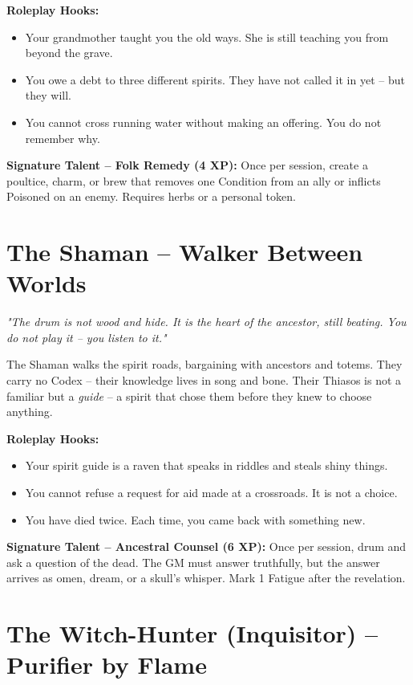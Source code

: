 \documentclass[10pt,a5paper]{book}
\begin{document}
\textbf{Roleplay Hooks:}
\begin{itemize}
    \item Your grandmother taught you the old ways. She is still teaching you from beyond the grave.
    \item You owe a debt to three different spirits. They have not called it in yet -- but they will.
    \item You cannot cross running water without making an offering. You do not remember why.
\end{itemize}

\textbf{Signature Talent -- Folk Remedy (4 XP):} Once per session, create a poultice, charm, or brew that removes one Condition from an ally or inflicts Poisoned on an enemy. Requires herbs or a personal token.

\section{The Shaman -- Walker Between Worlds}

\textit{"The drum is not wood and hide. It is the heart of the ancestor, still beating. You do not play it -- you listen to it."}

The Shaman walks the spirit roads, bargaining with ancestors and totems. They carry no Codex -- their knowledge lives in song and bone. Their Thiasos is not a familiar but a \textit{guide} -- a spirit that chose them before they knew to choose anything.

\textbf{Roleplay Hooks:}
\begin{itemize}
    \item Your spirit guide is a raven that speaks in riddles and steals shiny things.
    \item You cannot refuse a request for aid made at a crossroads. It is not a choice.
    \item You have died twice. Each time, you came back with something new.
\end{itemize}

\textbf{Signature Talent -- Ancestral Counsel (6 XP):} Once per session, drum and ask a question of the dead. The GM must answer truthfully, but the answer arrives as omen, dream, or a skull's whisper. Mark 1 Fatigue after the revelation.

\section{The Witch-Hunter (Inquisitor) -- Purifier by Flame}
\end{document}

